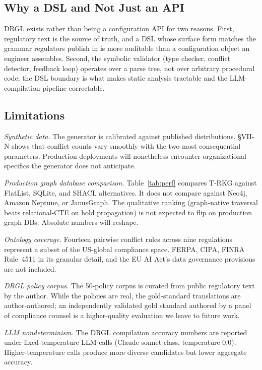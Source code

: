\documentclass{ieeeaccess}
\begin{document}
\subsection{Why a DSL and Not Just an API}

DRGL exists rather than being a configuration API for two reasons. First, regulatory text is the source of truth, and a DSL whose surface form matches the grammar regulators publish in is more auditable than a configuration object an engineer assembles. Second, the symbolic validator (type checker, conflict detector, feedback loop) operates over a parse tree, not over arbitrary procedural code; the DSL boundary is what makes static analysis tractable and the LLM-compilation pipeline correctable.

\subsection{Limitations}

\textit{Synthetic data.} The generator is calibrated against published distributions. §VII-N shows that conflict counts vary smoothly with the two most consequential parameters. Production deployments will nonetheless encounter organizational specifics the generator does not anticipate.

\textit{Production graph database comparison.} Table~\ref{tab:perf} compares T-RKG against FlatList, SQLite, and SHACL alternatives. It does not compare against Neo4j, Amazon Neptune, or JanusGraph. The qualitative ranking (graph-native traversal beats relational-CTE on hold propagation) is not expected to flip on production graph DBs. Absolute numbers will reshape.

\textit{Ontology coverage.} Fourteen pairwise conflict rules across nine regulations represent a subset of the US-global compliance space. FERPA, CIPA, FINRA Rule~4511 in its granular detail, and the EU AI Act's data governance provisions are not included.

\textit{DRGL policy corpus.} The 50-policy corpus is curated from public regulatory text by the author. While the policies are real, the gold-standard translations are author-authored; an independently validated gold standard authored by a panel of compliance counsel is a higher-quality evaluation we leave to future work.

\textit{LLM nondeterminism.} The DRGL compilation accuracy numbers are reported under fixed-temperature LLM calls (Claude sonnet-class, temperature 0.0). Higher-temperature calls produce more diverse candidates but lower aggregate accuracy.
\end{document}
